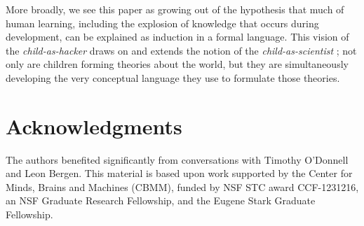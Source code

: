 \documentclass[10pt,letterpaper]{article}
\begin{document}
More broadly, we see this paper as growing out of the hypothesis that
much of human learning, including the explosion of knowledge that
occurs during development, can be explained as induction in a formal
language. This vision of the \emph{child-as-hacker} draws on and
extends the notion of the \emph{child-as-scientist} \citep{gopnik1996scientist}; not only are
children forming theories about the world, but they are simultaneously
developing the very conceptual language they use to formulate those
theories.

\section{Acknowledgments}

The authors benefited significantly from conversations with Timothy
O'Donnell and Leon Bergen. This material is based upon work supported
by the Center for Minds, Brains and Machines (CBMM), funded by NSF STC
award CCF-1231216, an NSF Graduate Research Fellowship, and the Eugene
Stark Graduate Fellowship.




\setlength{\bibleftmargin}{.125in}
\setlength{\bibindent}{-\bibleftmargin}

\end{document}
